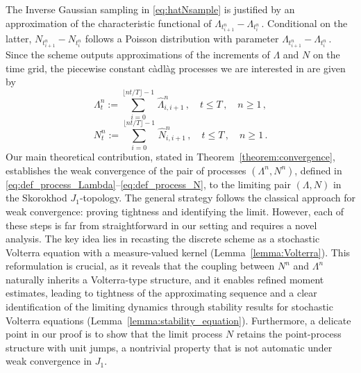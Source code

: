 \documentclass{article}
\newcommand{\1}{\mathbbm{1}}
\numberwithin{equation}{section}
\begin{document}
The Inverse Gaussian sampling in \eqref{eq:hatNsample} is justified by an approximation of the characteristic functional of $\Lambda_{t^n_{i+1}} - \Lambda_{t^n_i}\,$. Conditional on the latter, $N_{t^n_{i+1}} - N_{t^n_i}$ follows a Poisson distribution with parameter $\Lambda_{t^n_{i+1}} - \Lambda_{t^n_i}\,$. Since the scheme outputs approximations of the increments of $\Lambda$ and $N$ on the time grid, the piecewise constant càdlàg processes we are interested in are given by 
\begin{equation}
    \label{eq:def_process_Lambda}
\Lambda^n_t := \sum_{i = 0}^{\lfloor n t/T\rfloor - 1}\,\widehat \Lambda^n_{i,i+1}\,, \quad t \leq T\,, \quad n \geq 1 \,,
\end{equation}
\begin{equation}
    \label{eq:def_process_N}
    N^n_t := \sum_{i = 0}^{\lfloor nt/T\rfloor - 1}\,\widehat N^n_{i,i+1}\,, \quad t \leq T\,, \quad n \geq 1\,.
\end{equation}
Our main theoretical contribution, stated in Theorem~\ref{theorem:convergence}, establishes the weak convergence of the pair of processes $(\Lambda^n, N^n)$, defined in \eqref{eq:def_process_Lambda}--\eqref{eq:def_process_N}, to the limiting pair $(\Lambda, N)$ in the Skorokhod $J_1$-topology. The general strategy follows the classical approach for weak convergence: proving tightness and identifying the limit. However, each of these steps is far from straightforward in our setting and requires a novel analysis.  The key idea lies in recasting the discrete scheme as a stochastic Volterra equation with a measure-valued kernel (Lemma~\ref{lemma:Volterra}). This reformulation is crucial, as it reveals that the coupling between $N^n$ and $\Lambda^n$ naturally inherits a Volterra-type structure, and it enables refined moment  estimates, leading to tightness of the approximating sequence and a clear identification of the limiting dynamics through stability results for stochastic Volterra equations (Lemma~\ref{lemma:stability_equation}). Furthermore, a delicate point in our proof  is to show that the limit process $N$ retains the point-process structure with unit jumps, a nontrivial property that is not automatic under weak convergence in $J_1$.
\end{document}
